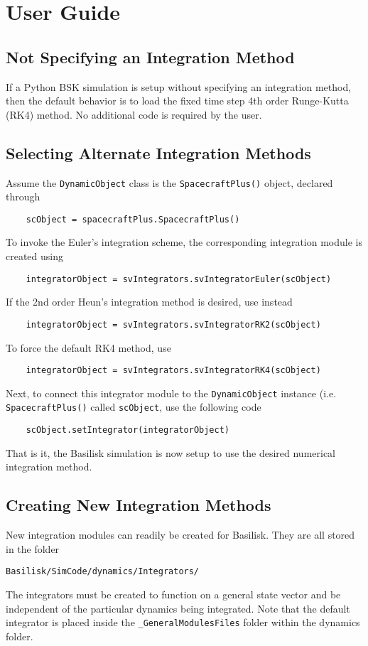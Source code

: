 \section{User Guide}

\subsection{Not Specifying an Integration Method}
If a Python BSK simulation is setup without specifying an integration method, then the default behavior is to load the fixed time step 4th order Runge-Kutta (RK4) method.  No additional code is required by the user.


\subsection{Selecting Alternate Integration Methods}
Assume the {\tt DynamicObject} class is the {\tt SpacecraftPlus()} object, declared through
\begin{verbatim}
	scObject = spacecraftPlus.SpacecraftPlus()
\end{verbatim}
To invoke the Euler's  integration scheme, the corresponding integration module is created using
\begin{verbatim}
	integratorObject = svIntegrators.svIntegratorEuler(scObject)
\end{verbatim}
If the 2nd order Heun's integration method is desired, use instead
\begin{verbatim}
	integratorObject = svIntegrators.svIntegratorRK2(scObject)
\end{verbatim}
To force the default RK4 method, use
\begin{verbatim}
	integratorObject = svIntegrators.svIntegratorRK4(scObject)
\end{verbatim}

Next, to connect this integrator module to the {\tt DynamicObject} instance (i.e. {\tt SpacecraftPlus()} called {\tt scObject}, use the following code
\begin{verbatim}
	scObject.setIntegrator(integratorObject)
\end{verbatim}
That is it, the Basilisk simulation is now setup to use the desired numerical  integration method.


\subsection{Creating New Integration Methods}
New integration modules can readily be created for Basilisk. They are all stored in the folder
\begin{verbatim}
Basilisk/SimCode/dynamics/Integrators/
\end{verbatim}
The integrators must be created to function on a general state vector and be independent of the particular dynamics being integrated. Note that the default integrator is placed inside the {\tt\_GeneralModulesFiles} folder within the dynamics folder.